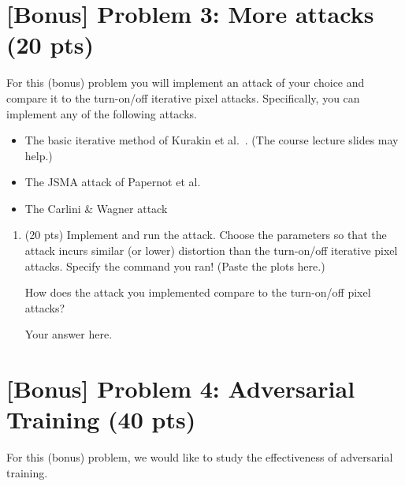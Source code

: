 \newpage
\section*{[Bonus] Problem 3: More attacks (20 pts)}
%

For this (bonus) problem you will implement an attack of your choice and compare it to the turn-on/off iterative pixel attacks. Specifically, you can implement any of the following attacks.

\begin{itemize}
	\item The basic iterative method of Kurakin et al.~\cite{kurakin2016adversarial}. (The course lecture slides may help.)
	\item The JSMA attack of Papernot et al.~\cite{papernot2016limitations}
	\item The Carlini \& Wagner attack~\cite{carlini2017towards}
\end{itemize}

%
\begin{enumerate}
%
	\item (20 pts) Implement and run the attack. Choose the parameters so that the attack incurs similar (or lower) distortion than the turn-on/off iterative pixel attacks. Specify the command you ran! (Paste the plots here.)
	
	How does the attack you implemented compare to the turn-on/off pixel attacks?
	
	\begin{answer}
	
		Your answer here.
		
	\end{answer}
%
\end{enumerate}


\section*{[Bonus] Problem 4: Adversarial Training (40 pts)}
%
For this (bonus) problem, we would like to study the effectiveness of adversarial training.

